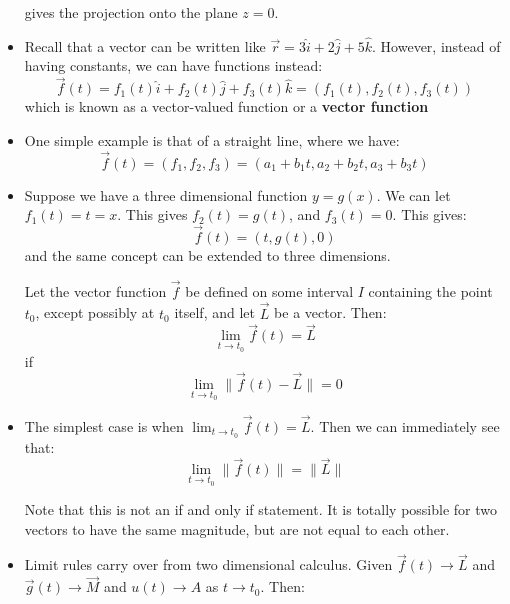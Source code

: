 \begin{itemize}
\begin{example}
        gives the projection onto the plane $z=0$.
    \end{example}
    \item Recall that a vector can be written like $\vec{r}=3\hat{i}+2\hat{j}+5\hat{k}$. However, instead of having constants, we can have functions instead:
    \begin{equation}
        \vec{f}(t) = f_1(t)\hat{i} + f_2(t)\hat{j} + f_3(t)\hat{k} = (f_1(t), f_2(t), f_3(t))
    \end{equation}
    which is known as a vector-valued function or a \textbf{vector function}
    \item One simple example is that of a straight line, where we have:
    \begin{equation}
        \vec{f}(t) = (f_1,f_2,f_3) = (a_1+b_1t,a_2+b_2t,a_3+b_3t)
    \end{equation}
    \item Suppose we have a three dimensional function $y=g(x)$. We can let $f_1(t)=t=x$. This gives $f_2(t)=g(t)$, and $f_3(t)=0$. This gives:
    \begin{equation}
        \vec{f}(t) = (t, g(t), 0)
    \end{equation}
    and the same concept can be extended to three dimensions.
    \begin{definition}
        Let the vector function $\vec{f}$ be defined on some interval $I$ containing the point $t_0$, except possibly at $t_0$ itself, and let $\vec{L}$ be a vector. Then:
        \begin{equation}
            \lim_{t\to t_0} \vec{f}(t) = \vec{L}
        \end{equation}
        if 
        \begin{equation}
            \lim_{t\to t_0} \lVert\vec{f}(t)-\vec{L}\rVert = 0
        \end{equation}
    \end{definition}
    \item The simplest case is when $\lim_{t\to t_0} \vec{f}(t) = \vec{L}$. Then we can immediately see that:
    \begin{equation}
        \lim_{t\to t_0} \lVert \vec{f}(t) \rVert = \lVert \vec{L} \rVert
    \end{equation}
    \begin{warning}
        Note that this is not an if and only if statement. It is totally possible for two vectors to have the same magnitude, but are not equal to each other.
    \end{warning}
    \item Limit rules carry over from two dimensional calculus. Given $\vec{f}(t) \to \vec{L}$ and $\vec{g}(t) \to \vec{M}$ and $u(t) \to A$ as $t\to t_0$. Then:

\end{itemize}
